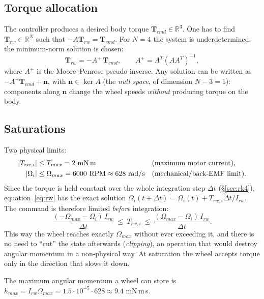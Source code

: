 \documentclass[11pt,a4paper]{article}
\newcommand{\vect}[1]{\bm{#1}}
\newcommand{\T}{\vect{T}}
\begin{document}
\subsection{Torque allocation}
The controller produces a desired body torque $\T_{cmd}\in\mathbb{R}^3$.
One has to find $\vect T_{rw}\in\mathbb{R}^N$ such that $-A\vect T_{rw}=\T_{cmd}$.
For $N=4$ the system is underdetermined; the minimum-norm solution is
chosen:
\begin{equation}
  \vect T_{rw} = -A^{+}\,\T_{cmd},\qquad A^{+} = A^T(AA^T)^{-1},
\end{equation}
where $A^+$ is the Moore--Penrose pseudo-inverse. Any solution can be
written as $-A^+\T_{cmd} + \vect n$, with $\vect n\in\ker A$ (the \emph{null
space}, of dimension $N-3=1$): components along $\vect n$ change the wheel
speeds \emph{without} producing torque on the body.

\subsection{Saturations}
Two physical limits:
\begin{align}
  |T_{rw,i}| &\le T_{max} = 2\ \text{mN\,m} &&\text{(maximum motor current)},\\
  |\Omega_i| &\le \Omega_{max} = 6000\ \text{RPM}\approx 628\ \text{rad/s} &&\text{(mechanical/back-EMF limit)}.
\end{align}
Since the torque is held constant over the whole integration step
$\Delta t$ (\S\ref{sec:rk4}), equation~\eqref{eq:rw} has the exact solution
$\Omega_i(t+\Delta t) = \Omega_i(t) + T_{rw,i}\Delta t/I_{rw}$. The command is
therefore limited \emph{before} integration:
\begin{equation}
  \frac{(-\Omega_{max}-\Omega_i)\,I_{rw}}{\Delta t}
  \ \le\ T_{rw,i}\ \le\
  \frac{(\Omega_{max}-\Omega_i)\,I_{rw}}{\Delta t}.
\end{equation}
This way the wheel reaches exactly $\Omega_{max}$ without ever exceeding it,
and there is no need to ``cut'' the state afterwards
(\emph{clipping}), an operation that would destroy angular momentum in a
non-physical way. At saturation the wheel accepts torque only in the direction
that slows it down.

The maximum angular momentum a wheel can store is
$h_{max} = I_{rw}\Omega_{max} = 1.5\cdot10^{-5}\cdot628 \approx 9.4$ mN\,m\,s.
\end{document}
